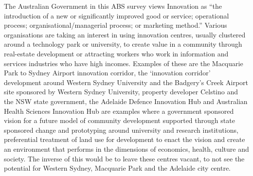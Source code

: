  The Australian Government in this ABS survey views Innovation as ``the introduction of a new or significantly improved good or service; operational process; organisational/managerial process; or marketing method.''\cite{RefWorks:241} Various organisations are taking an interest in using innovation centres, usually clustered around a technology park or university, to create value in a community through real-estate development or attracting workers who work in information and services industries who have high incomes. Examples of these are the Macquarie Park to Sydney Airport innovation corridor, the `innovation corridor' development around Western Sydney University and the Badgery's Creek Airport site sponsored by Western Sydney University, property developer Celstino\cite{RefWorks:245} and the NSW state government\cite{RefWorks:246}, the Adelaide Defence Innovation Hub\cite{RefWorks:243} and Australian Health Sciences Innovation Hub\cite{RefWorks:244} are examples where a government sponsored vision for a future model of community development supported through state sponsored change and prototyping around university and research  institutions, preferential treatment of land use for development to enact the vision and create an environment that performs in the dimensions of economics, health, culture and society. The inverse of this would be to leave these centres vacant, to not see the potential for Western Sydney, Macquarie Park and the Adelaide city centre. 



